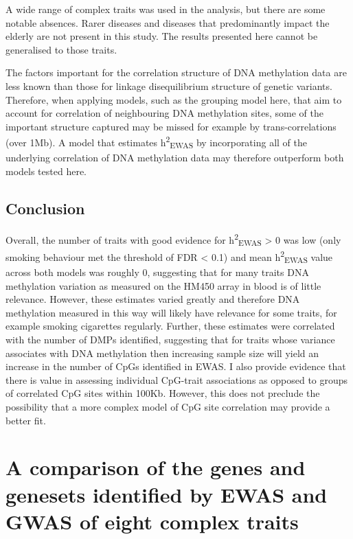 \documentclass[11pt,twoside]{bristolthesis}
\begin{document}
A wide range of complex traits was used in the analysis, but there are some notable absences. Rarer diseases and diseases that predominantly impact the elderly are not present in this study. The results presented here cannot be generalised to those traits.

The factors important for the correlation structure of DNA methylation data are less known than those for linkage disequilibrium structure of genetic variants. Therefore, when applying models, such as the grouping model here, that aim to account for correlation of neighbouring DNA methylation sites, some of the important structure captured may be missed for example by trans-correlations (over 1Mb). A model that estimates h\textsuperscript{2}\textsubscript{EWAS} by incorporating all of the underlying correlation of DNA methylation data may therefore outperform both models tested here.

\hypertarget{conclusion-05}{%
\section{Conclusion}\label{conclusion-05}}

Overall, the number of traits with good evidence for h\textsuperscript{2}\textsubscript{EWAS} \textgreater{} 0 was low (only smoking behaviour met the threshold of FDR \textless{} 0.1) and mean h\textsuperscript{2}\textsubscript{EWAS} value across both models was roughly 0, suggesting that for many traits DNA methylation variation as measured on the HM450 array in blood is of little relevance. However, these estimates varied greatly and therefore DNA methylation measured in this way will likely have relevance for some traits, for example smoking cigarettes regularly. Further, these estimates were correlated with the number of DMPs identified, suggesting that for traits whose variance associates with DNA methylation then increasing sample size will yield an increase in the number of CpGs identified in EWAS. I also provide evidence that there is value in assessing individual CpG-trait associations as opposed to groups of correlated CpG sites within 100Kb. However, this does not preclude the possibility that a more complex model of CpG site correlation may provide a better fit.

\hypertarget{ewas-gwas-comp-chapter}{%
\chapter{A comparison of the genes and genesets identified by EWAS and GWAS of eight complex traits}\label{ewas-gwas-comp-chapter}}
\end{document}
